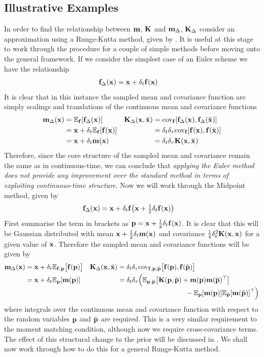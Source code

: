 \subsection{Illustrative Examples}
In order to find the relationship between $\mathbf{m}$, $\mathbf{K}$ and $\mathbf{m}_{\Delta}$, $\mathbf{K}_{\Delta}$ consider an approximation using a Runge-Kutta method, given by .
It is useful at this stage to work through the procedure for a couple of simple methods before moving onto the general framework. If we consider the simplest case of an Euler scheme we have the relationship
\begin{align*}
\mathbf{f}_{\Delta}(\mathbf{x}) &= \mathbf{x} + \delta_t \mathbf{f}(\mathbf{x})
\end{align*}
It is clear that in this instance the sampled mean and covariance function are simply scalings and translations of the continuous mean and covariance functions
\begin{align*}
\mathbf{m}_\Delta(\mathbf{x}) &= \mathbb{E}_{\mathbf{f}}[\mathbf{f}_{\Delta}(\mathbf{x})] &  \mathbf{K}_\Delta(\mathbf{x},\tilde{\mathbf{x}}) &= \mathrm{cov}_{\mathbf{f}}[\mathbf{f}_{\Delta}(\mathbf{x}),\mathbf{f}_{\Delta}(\tilde{\mathbf{x}})] \\
&= \mathbf{x} + \delta_t \mathbb{E}_{\mathbf{f}}[\mathbf{f}(\mathbf{x})]             & &= \delta_t\delta_\tau \mathrm{cov}_{\mathbf{f}}[\mathbf{f}(\mathbf{x}),\mathbf{f}(\tilde{\mathbf{x}})] \\
&= \mathbf{x} + \delta_t \mathbf{m}(\mathbf{x})                     & &= \delta_t\delta_\tau \mathbf{K}(\mathbf{x},\tilde{\mathbf{x}}) 
\end{align*}
Therefore, since the core structure of the sampled mean and covariance remain the same as in continuous-time, we can conclude that \textit{applying the Euler method does not provide any improvement over the standard method in terms of exploiting continuous-time structure}. Now we will work through the Midpoint method, given by
\begin{align*}
\mathbf{f}_{\Delta}(\mathbf{x}) &= \mathbf{x} + \delta_t \mathbf{f}\big(\mathbf{x} + \tfrac{1}{2}\delta_t \mathbf{f}(\mathbf{x})\big)
\end{align*}
First summarise the term in brackets as $\mathbf{p} = \mathbf{x} + \tfrac{1}{2}\delta_t \mathbf{f}(\mathbf{x})$. It is clear that this will be Gaussian distributed with mean $\mathbf{x} + \tfrac{1}{2}\delta_t \mathbf{m}(\mathbf{x})$ and covariance $\tfrac{1}{4}\delta_t^2 \mathbf{K}(\mathbf{x},\mathbf{x})$ for a given value of $\mathbf{x}$.
%
Therefore the sampled mean and covariance functions will be given by
\begin{align*}
\mathbf{m}_\Delta(\mathbf{x}) &= \mathbf{x} + \delta_t \mathbb{E}_{\mathbf{f},\mathbf{p}}\big[\mathbf{f}(\mathbf{p})\big]  &  
\mathbf{K}_\Delta(\mathbf{x},\tilde{\mathbf{x}}) &= \delta_t\delta_\tau\mathrm{cov}_{\mathbf{f},\mathbf{p},\tilde{\mathbf{p}}}\big[\mathbf{f}(\mathbf{p}),\mathbf{f}(\tilde{\mathbf{p}})\big] \\
&= \mathbf{x} + \delta_t \mathbb{E}_{\mathbf{p}}[\mathbf{m}(\mathbf{p})] &
&= \delta_t\delta_\tau\Big( \mathbb{E}_{\mathbf{p},\tilde{\mathbf{p}}}\big[\mathbf{K}(\mathbf{p},\tilde{\mathbf{p}}) + \mathbf{m}(\mathbf{p})\mathbf{m}(\tilde{\mathbf{p}})^\top\big] \\[-0.1cm]
&&&\qquad\qquad\qquad\qquad\qquad
-\mathbb{E}_{\mathbf{p}}[\mathbf{m}(\mathbf{p})]\mathbb{E}_{\tilde{\mathbf{p}}}[\mathbf{m}(\tilde{\mathbf{p}})]^\top \Big)
\end{align*}
where integrals over the continuous mean and covariance function with respect to the random variables $\mathbf{p}$ and $\tilde{\mathbf{p}}$ are required. This is a very similar requirement to the moment matching condition, although now we require cross-covariance terms. The effect of this structural change to the prior will be discussed in . We shall now work through how to do this for a general Runge-Kutta method.


